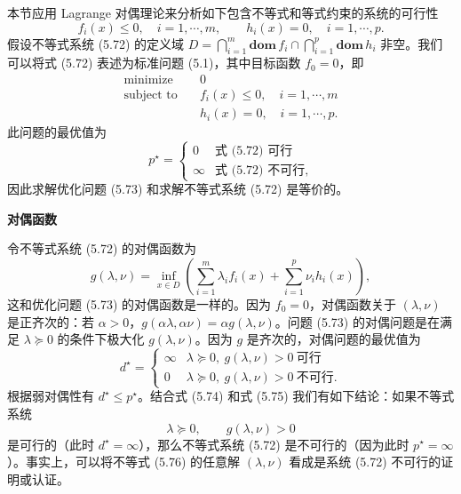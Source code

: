 \documentclass[UTF8,12pt,a4paper,fontset=fandol]{ctexart}
\begin{document}
本节应用 Lagrange 对偶理论来分析如下包含不等式和等式约束的系统的可行性
\begin{equation}
f_i(x)\leq 0,\quad i=1,\cdots,m,\qquad h_i(x)=0,\quad i=1,\cdots,p.
\tag{5.72}
\end{equation}
假设不等式系统 (5.72) 的定义域 $D=\bigcap_{i=1}^m\mathbf{dom}\,f_i\cap\bigcap_{i=1}^p\mathbf{dom}\,h_i$ 非空。我们可以将式 (5.72) 表述为标准问题 (5.1)，其中目标函数 $f_0=0$，即
\begin{equation}
\begin{aligned}
\text{minimize}\quad & 0\\
\text{subject to}\quad & f_i(x)\leq 0,\quad i=1,\cdots,m\\
& h_i(x)=0,\quad i=1,\cdots,p.
\end{aligned}
\tag{5.73}
\end{equation}
此问题的最优值为
\begin{equation}
p^\star=
\begin{cases}
0 & \text{式 (5.72) 可行}\\
\infty & \text{式 (5.72) 不可行},
\end{cases}
\tag{5.74}
\end{equation}
因此求解优化问题 (5.73) 和求解不等式系统 (5.72) 是等价的。

\noindent\textbf{对偶函数}

令不等式系统 (5.72) 的对偶函数为
\[
g(\lambda,\nu)=\inf_{x\in D}\left(\sum_{i=1}^m\lambda_i f_i(x)+\sum_{i=1}^p\nu_i h_i(x)\right),
\]
这和优化问题 (5.73) 的对偶函数是一样的。因为 $f_0=0$，对偶函数关于 $(\lambda,\nu)$ 是正齐次的：若 $\alpha>0$，$g(\alpha\lambda,\alpha\nu)=\alpha g(\lambda,\nu)$。问题 (5.73) 的对偶问题是在满足 $\lambda\succeq 0$ 的条件下极大化 $g(\lambda,\nu)$。因为 $g$ 是齐次的，对偶问题的最优值为
\begin{equation}
d^\star=
\begin{cases}
\infty & \lambda\succeq 0,\ g(\lambda,\nu)>0\ \text{可行}\\
0 & \lambda\succeq 0,\ g(\lambda,\nu)>0\ \text{不可行}.
\end{cases}
\tag{5.75}
\end{equation}
根据弱对偶性有 $d^\star\leq p^\star$。结合式 (5.74) 和式 (5.75) 我们有如下结论：如果不等式系统
\begin{equation}
\lambda\succeq 0,\qquad g(\lambda,\nu)>0
\tag{5.76}
\end{equation}
是可行的（此时 $d^\star=\infty$），那么不等式系统 (5.72) 是不可行的（因为此时 $p^\star=\infty$）。事实上，可以将不等式 (5.76) 的任意解 $(\lambda,\nu)$ 看成是系统 (5.72) 不可行的证明或认证。
\end{document}
